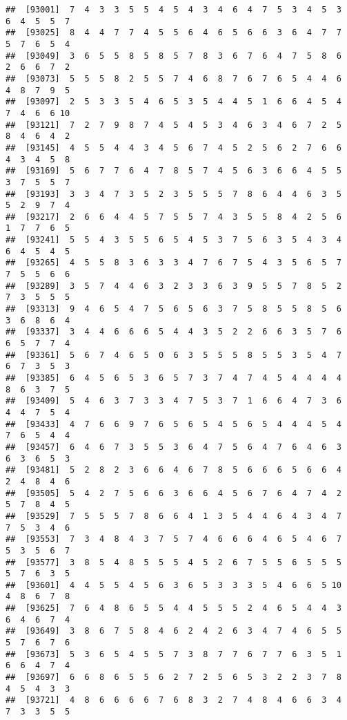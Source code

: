 \documentclass[
]{book}
\begin{document}
\begin{verbatim}
##  [93001]  7  4  3  3  5  5  4  5  4  3  4  6  4  7  5  3  4  5  3  6  4  5  5  7
##  [93025]  8  4  4  7  7  4  5  5  6  4  6  5  6  6  3  6  4  7  7  5  7  6  5  4
##  [93049]  3  6  5  5  8  5  8  5  7  8  3  6  7  6  4  7  5  8  6  2  6  6  7  2
##  [93073]  5  5  5  8  2  5  5  7  4  6  8  7  6  7  6  5  4  4  6  4  8  7  9  5
##  [93097]  2  5  3  3  5  4  6  5  3  5  4  4  5  1  6  6  4  5  4  7  4  6  6 10
##  [93121]  7  2  7  9  8  7  4  5  4  5  3  4  6  3  4  6  7  2  5  8  4  6  4  2
##  [93145]  4  5  5  4  4  3  4  5  6  7  4  5  2  5  6  2  7  6  6  4  3  4  5  8
##  [93169]  5  6  7  7  6  4  7  8  5  7  4  5  6  3  6  6  4  5  5  3  7  5  5  7
##  [93193]  3  3  4  7  3  5  2  3  5  5  5  7  8  6  4  4  6  3  5  5  2  9  7  4
##  [93217]  2  6  6  4  4  5  7  5  5  7  4  3  5  5  8  4  2  5  6  1  7  7  6  5
##  [93241]  5  5  4  3  5  5  6  5  4  5  3  7  5  6  3  5  4  3  4  6  4  5  4  5
##  [93265]  4  5  5  8  3  6  3  3  4  7  6  7  5  4  3  5  6  5  7  7  5  5  6  6
##  [93289]  3  5  7  4  4  6  3  2  3  3  6  3  9  5  5  7  8  5  2  7  3  5  5  5
##  [93313]  9  4  6  5  4  7  5  6  5  6  3  7  5  8  5  5  8  5  6  3  6  8  6  4
##  [93337]  3  4  4  6  6  6  5  4  4  3  5  2  2  6  6  3  5  7  6  6  5  7  7  4
##  [93361]  5  6  7  4  6  5  0  6  3  5  5  5  8  5  5  3  5  4  7  6  7  3  5  3
##  [93385]  6  4  5  6  5  3  6  5  7  3  7  4  7  4  5  4  4  4  4  8  6  3  7  5
##  [93409]  5  4  6  3  7  3  3  4  7  5  3  7  1  6  6  4  7  3  6  4  4  7  5  4
##  [93433]  4  7  6  6  9  7  6  5  6  5  4  5  6  5  4  4  4  5  4  7  6  5  4  4
##  [93457]  6  4  6  7  3  5  5  3  6  4  7  5  6  4  7  6  4  6  3  6  3  6  5  3
##  [93481]  5  2  8  2  3  6  6  4  6  7  8  5  6  6  6  5  6  6  4  2  4  8  4  6
##  [93505]  5  4  2  7  5  6  6  3  6  6  4  5  6  7  6  4  7  4  2  5  7  8  4  5
##  [93529]  7  5  5  5  7  8  6  6  4  1  3  5  4  4  6  4  3  4  7  7  5  3  4  6
##  [93553]  7  3  4  8  4  3  7  5  7  4  6  6  6  4  6  5  4  6  7  5  3  5  6  7
##  [93577]  3  8  5  4  8  5  5  5  4  5  2  6  7  5  5  6  5  5  5  5  7  6  3  5
##  [93601]  4  4  5  5  4  5  6  3  6  5  3  3  3  5  4  6  6  5 10  4  8  6  7  8
##  [93625]  7  6  4  8  6  5  5  4  4  5  5  5  2  4  6  5  4  4  3  6  4  6  7  4
##  [93649]  3  8  6  7  5  8  4  6  2  4  2  6  3  4  7  4  6  5  5  5  7  6  7  6
##  [93673]  5  3  6  5  4  5  5  7  3  8  7  7  6  7  7  6  3  5  1  6  6  4  7  4
##  [93697]  6  6  8  6  5  5  6  2  7  2  5  6  5  3  2  2  3  7  8  4  5  4  3  3
##  [93721]  4  8  6  6  6  6  7  6  8  3  2  7  4  8  4  6  6  3  4  7  3  3  5  5

\end{verbatim}
\end{document}
